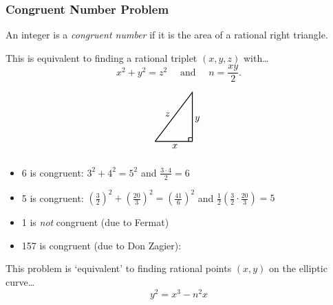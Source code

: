 \begin{frame} \frametitle{Congruent Number Problem} \scriptsize
An integer is a \textit{congruent number} if it is the area of a rational right triangle. \par\vspace{0.5\baselineskip}

\begin{minipage}{0.5\textwidth}
This is equivalent to finding a rational triplet $(x,y,z)$ with\dots
	\[
	x^2 + y^2= z^2 \quad \text{ and } \quad n= \dfrac{xy}{2}.
	\] 
\end{minipage}\begin{minipage}{0.5\textwidth}
\end{minipage}\begin{minipage}{0.5\textwidth}
	\[
	\begin{tikzpicture}[scale=0.9]
	\draw[line width=0.03cm] (0,0) -- (1.5,0) -- (1.5,2) -- (0,0);
	\draw[line width=0.03cm] (1.35,0) -- (1.35,0.15) -- (1.5,0.15);
	\node at (0.8,-0.2) {$x$};
	\node at (1.7,0.9) {$y$};
	\node at (0.5,1.1) {$z$};
	\end{tikzpicture}
	\]
\end{minipage}

\begin{ex}
\begin{itemize} \scriptsize
\item 6 is congruent: $3^2 + 4^2= 5^2$ and $\frac{3 \cdot 4}{2} = 6$
\item 5 is congruent: $\left( \frac{3}{2} \right)^2 + \left( \frac{20}{3} \right)^2= \left( \frac{41}{6} \right)^2$ and $\frac{1}{2} \left( \frac{3}{2} \cdot \frac{20}{3} \right)= 5$
\item 1 is \emph{not} congruent (due to Fermat) 
\item 157 is congruent (due to Don Zagier): \par\vspace{0.1cm}
\end{itemize}
\end{ex}

This problem is `equivalent' to finding rational points $(x, y)$ on the elliptic curve\dots
	\[
	y^2 = x^3 - n^2x
	\]

\end{frame}



